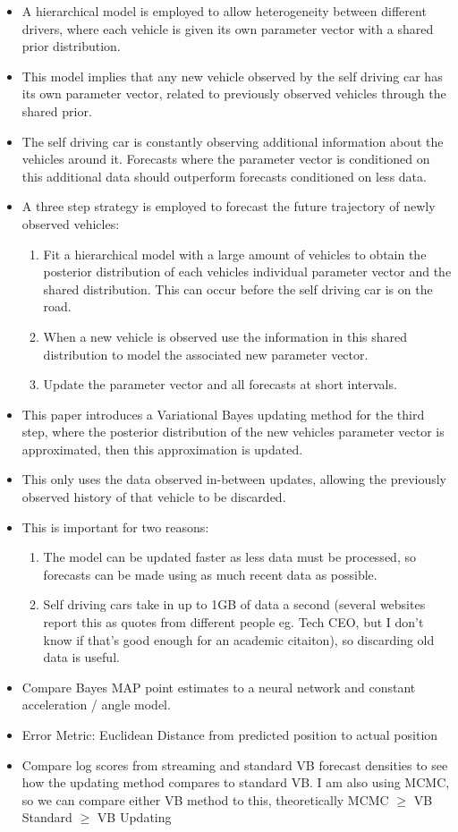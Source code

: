 \documentclass[12pt,a4paper]{article}\usepackage[]{graphicx}\usepackage[]{color}
\begin{document}
\begin{itemize}
\item A hierarchical model is employed to allow heterogeneity between different drivers, where each vehicle is given its own parameter vector with a shared prior distribution.
\item This model implies that any new vehicle observed by the self driving car has its own parameter vector, related to previously observed vehicles through the shared prior.
\item The self driving car is constantly observing additional information about the vehicles around it. Forecasts where the parameter vector is conditioned on this additional data should outperform forecasts conditioned on less data.
\item A three step strategy is employed to forecast the future trajectory of newly observed vehicles:
\begin{enumerate}
\item Fit a hierarchical model with a large amount of vehicles to obtain the posterior distribution of each vehicles individual parameter vector and the shared distribution. This can occur before the self driving car is on the road.
\item When a new vehicle is observed use the information in this shared distribution to model the associated new parameter vector. 
\item Update the parameter vector and all forecasts at short intervals.
\end{enumerate}
\item This paper introduces a Variational Bayes updating method for the third step, where the posterior distribution of the new vehicles parameter vector is approximated, then this approximation is updated.
\item This only uses the data observed in-between updates, allowing the previously observed history of that vehicle to be discarded.
\item This is important for two reasons:
\begin{enumerate}
\item The model can be updated faster as less data must be processed, so forecasts can be made using as much recent data as possible.
\item Self driving cars take in up to 1GB of data a second (several websites report this as quotes from different people eg. Tech CEO, but I don't know if that's good enough for an academic citaiton), so discarding old data is useful.
\end{enumerate}
\item Compare Bayes MAP point estimates to a neural network and constant acceleration / angle model.
\item Error Metric: Euclidean Distance from predicted position to actual position
\item Compare log scores from streaming and standard VB forecast densities to see how the updating method compares to standard VB. I am also using MCMC, so we can compare either VB method to this, theoretically MCMC $\geq$ VB Standard $\geq$ VB Updating
\end{itemize}
\end{document}
